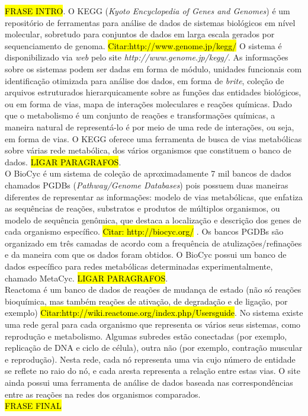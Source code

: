 \documentclass[conference]{IEEEtran}
\begin{document}
\hl{FRASE INTRO}. O KEGG (\textit{Kyoto Encyclopedia of Genes and Genomes}) é um repositório de ferramentas para análise de dados de sistemas biológicos em nível molecular, sobretudo para conjuntos de dados em larga escala gerados por sequenciamento de genoma. \hl{Citar:http://www.genome.jp/kegg/} O sistema é disponibilizado via \textit{web} pelo site \textit{http://www.genome.jp/kegg/}. As informações sobre os sistemas podem ser dadas em forma de módulo, unidades funcionais com identificação otimizada para análise dos dados, em forma de \textit{brite}, coleção de arquivos estruturados hierarquicamente sobre as funções das entidades biológicos, ou em forma de vias, mapa de interações moleculares e reações químicas. Dado que o metabolismo é um conjunto de reações e transformações químicas, a maneira natural de representá-lo é por meio de uma rede de interações, ou seja, em forma de vias. O KEGG oferece uma ferramenta de busca de vias metabólicas sobre várias rede metabólica, dos vários organismos que constituem o banco de dados. \hl{LIGAR PARAGRAFOS}.\\
\indent O BioCyc é um sistema de coleção de aproximadamente 7 mil bancos de dados chamados PGDBs (\textit{Pathway/Genome Databases}) pois possuem duas maneiras diferentes de representar as informações: modelo de vias metabólicas, que enfatiza as sequências de reações, substratos e produtos de múltiplos organismos, ou modelo de sequência genômica, que destaca a localização e descrição dos genes de cada organismo específico. \hl{Citar: http://biocyc.org/} . Os bancos PGDBs são organizado em três camadas de acordo com a frequência de atulizações/refinações e da maneira com que os dados foram obtidos. O BioCyc possui um banco de dados específico para redes metabólicas determinadas experimentalmente, chamado MetaCyc. \hl{LIGAR PARAGRAFOS}.\\
\indent Reactoma é um banco de dados de reações de mudança de estado (não só reações bioquímica, mas também reações de ativação, de degradação e de ligação, por exemplo) \hl{Citar:http://wiki.reactome.org/index.php/Usersguide}. No sistema existe uma rede geral para cada organismo que representa os vários seus sistemas, como reprodução e metabolismo. Algumas subredes estão conectadas (por exemplo, replicação de DNA e ciclo de célula), outra não (por exemplo, contração muscular e reprodução). Nesta rede, cada nó representa uma via cujo número de entidade se reflete no raio do nó, e cada aresta representa a relação entre estas vias. O site ainda possui uma ferramenta de análise de dados baseada nas correspondências entre as reações na redes dos organismos comparados. \\
\hl{FRASE FINAL}
\end{document}
